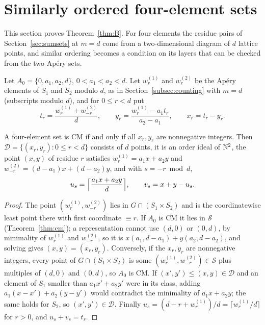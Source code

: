 \section{Similarly ordered four-element sets}\label{sec:similar}\label{subsec:similar}

This section proves Theorem~\ref{thm:B}. For four elements the residue pairs of Section~\ref{sec:sumsets} at $m=d$ come from a two-dimensional diagram of $d$ lattice points, and similar ordering becomes a condition on its layers that can be checked from the two Ap\'ery sets.


Let $A_0=\{0,a_1,a_2,d\}$, $0<a_1<a_2<d$. Let $w^{(1)}_r$ and $w^{(2)}_r$ be the Ap\'ery elements of $S_1$ and $S_2$ modulo $d$, as in Section~\ref{subsec:counting} with $m=d$ (subscripts modulo $d$), and for $0\le r<d$ put
\begin{equation}\label{eq:diagram}
t_r=\frac{w^{(1)}_r+w^{(2)}_{-r}}{d},\qquad y_r=\frac{w^{(1)}_r-a_1t_r}{a_2-a_1},\qquad x_r=t_r-y_r .
\end{equation}

\begin{lemma}\label{lem:diagram}
A four-element set is CM if and only if all $x_r,y_r$ are nonnegative integers. Then $\mathcal D=\{(x_r,y_r):0\le r<d\}$ consists of $d$ points, it is an order ideal of $\mathbb{N}^2$, the point $(x,y)$ of residue $r$ satisfies $w^{(1)}_r=a_1x+a_2y$ and $w^{(2)}_{-r}=(d-a_1)x+(d-a_2)y$, and with $s=-r\bmod d$,
\begin{equation}\label{eq:uv-diagram}
u_s=\Bigl\lceil\frac{a_1x+a_2y}{d}\Bigr\rceil,\qquad v_s=x+y-u_s .
\end{equation}
\end{lemma}

\begin{proof}
The point $(w^{(1)}_r,w^{(2)}_{-r})$ lies in $G\cap(S_1\times S_2)$ and is the coordinatewise least point there with first coordinate $\equiv r$. If $A_0$ is CM it lies in $\mathcal S$ (Theorem~\ref{thm:cm}); a representation cannot use $(d,0)$ or $(0,d)$, by minimality of $w^{(1)}_r$ and $w^{(2)}_{-r}$, so it is $x(a_1,d-a_1)+y(a_2,d-a_2)$, and solving gives $(x,y)=(x_r,y_r)$. Conversely, if the $x_r,y_r$ are nonnegative integers, every point of $G\cap(S_1\times S_2)$ is some $(w^{(1)}_r,w^{(2)}_{-r})\in\mathcal S$ plus multiples of $(d,0)$ and $(0,d)$, so $A_0$ is CM. If $(x',y')\le(x,y)\in\mathcal D$ and an element of $S_1$ smaller than $a_1x'+a_2y'$ were in its class, adding $a_1(x-x')+a_2(y-y')$ would contradict the minimality of $a_1x+a_2y$; the same holds for $S_2$, so $(x',y')\in\mathcal D$. Finally $u_s=(d-r+w^{(1)}_r)/d=\lceil w^{(1)}_r/d\rceil$ for $r>0$, and $u_s+v_s=t_r$.
\end{proof}

